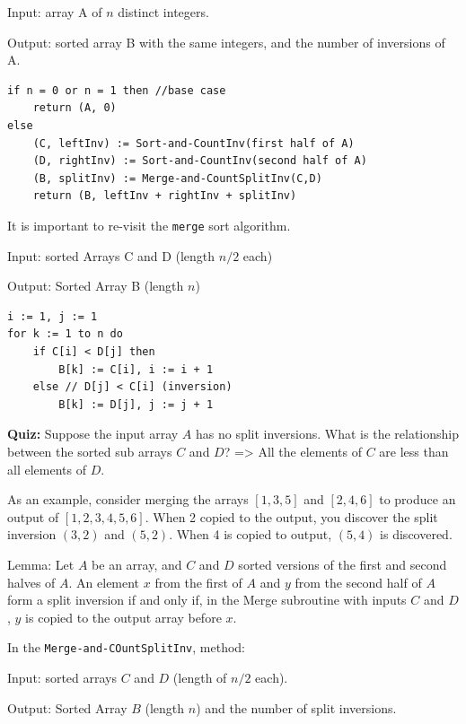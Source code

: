 \documentclass[11pt]{article}
\begin{document}
Input: array A of $n$ distinct integers.

Output: sorted array B with the same integers, and the number of inversions of A.

\vspace{11pt}
\begin{lstlisting}
if n = 0 or n = 1 then //base case
    return (A, 0)
else
    (C, leftInv) := Sort-and-CountInv(first half of A)
    (D, rightInv) := Sort-and-CountInv(second half of A)
    (B, splitInv) := Merge-and-CountSplitInv(C,D)
    return (B, leftInv + rightInv + splitInv)
\end{lstlisting}
\vspace{11pt}

It is important to re-visit the \texttt{merge} sort algorithm.

Input: sorted Arrays C and D (length $n/2$ each)

Output: Sorted Array B (length $n$)

\vspace{11pt}
\begin{lstlisting}
i := 1, j := 1
for k := 1 to n do
    if C[i] < D[j] then
        B[k] := C[i], i := i + 1
    else // D[j] < C[i] (inversion)
        B[k] := D[j], j := j + 1
\end{lstlisting}
\vspace{11pt}

\textbf{Quiz:} Suppose the input array $A$ has no split inversions. What is the relationship between the sorted sub arrays $C$ and $D$? => All the elements of $C$ are less than all elements of $D$.

As an example, consider merging the arrays $[1,3,5]$ and $[2,4,6]$ to produce an output of $[1,2,3,4,5,6]$. When 2 copied to the output, you discover the split inversion $(3,2)$ and $(5,2)$. When 4 is copied to output, $(5,4)$ is discovered.

Lemma: Let $A$ be an array, and $C$ and $D$ sorted versions of the first and second halves of $A$. An element $x$ from the first of $A$ and $y$ from the second half of $A$ form a split inversion if and only if, in the Merge subroutine with inputs $C$ and $D$, $y$ is copied to the output array before $x$.

\vspace{11pt}
In the \texttt{Merge-and-COuntSplitInv}, method:

Input: sorted arrays $C$ and $D$ (length of $n/2$ each).

Output: Sorted Array $B$ (length $n$) and the number of split inversions.
\end{document}
